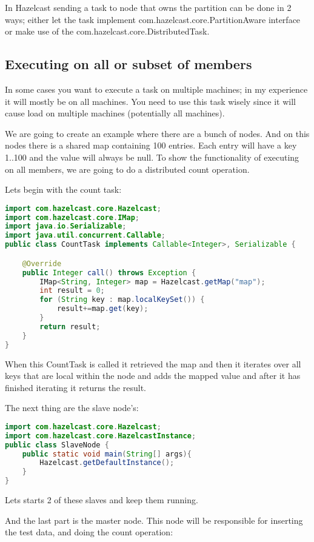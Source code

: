 In Hazelcast sending a task to node that owns the partition can be done in 2 ways; either let the task implement com.hazelcast.core.PartitionAware interface or make use of the com.hazelcast.core.DistributedTask.

\subsection{Executing on all or subset of members}
In some cases you want to execute a task on multiple machines; in my experience it will mostly be on all machines. You need to use this task wisely since it will cause load on multiple machines (potentially all machines).

We are going to create an example where there are a bunch of nodes. And on this nodes there is a shared map containing 100 entries. Each entry will have a key 1..100 and the value will always be null. To show the functionality of executing on all members, we are going to do a distributed count operation.

Lets begin with the count task:
\begin{lstlisting}[language=java]
import com.hazelcast.core.Hazelcast;
import com.hazelcast.core.IMap;
import java.io.Serializable;
import java.util.concurrent.Callable;
public class CountTask implements Callable<Integer>, Serializable {

    @Override
    public Integer call() throws Exception {
        IMap<String, Integer> map = Hazelcast.getMap("map");
        int result = 0;
        for (String key : map.localKeySet()) {
            result+=map.get(key);
        }
        return result;
    }
}
\end{lstlisting}
When this CountTask is called it retrieved the map and then it iterates over all keys that are local within the node and adds the mapped value and after it has finished iterating it returns the result.

The next thing are the slave node's:
\begin{lstlisting}[language=java]
import com.hazelcast.core.Hazelcast;
import com.hazelcast.core.HazelcastInstance;
public class SlaveNode {
    public static void main(String[] args){
        Hazelcast.getDefaultInstance();
    }
}
\end{lstlisting}
Lets starts 2 of these slaves and keep them running.

And the last part is the master node. This node will be responsible for inserting the test data, and doing the count operation:

